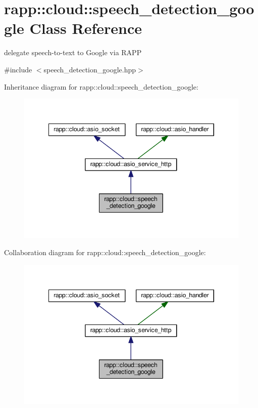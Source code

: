 \hypertarget{classrapp_1_1cloud_1_1speech__detection__google}{\section{rapp\-:\-:cloud\-:\-:speech\-\_\-detection\-\_\-google Class Reference}
\label{classrapp_1_1cloud_1_1speech__detection__google}
}


delegate speech-\/to-\/text to Google via R\-A\-P\-P  




{\ttfamily \#include $<$speech\-\_\-detection\-\_\-google.\-hpp$>$}



Inheritance diagram for rapp\-:\-:cloud\-:\-:speech\-\_\-detection\-\_\-google\-:
\nopagebreak
\begin{figure}[H]
\begin{center}
\leavevmode
\includegraphics[width=345pt]{classrapp_1_1cloud_1_1speech__detection__google__inherit__graph}
\end{center}
\end{figure}


Collaboration diagram for rapp\-:\-:cloud\-:\-:speech\-\_\-detection\-\_\-google\-:
\nopagebreak
\begin{figure}[H]
\begin{center}
\leavevmode
\includegraphics[width=345pt]{classrapp_1_1cloud_1_1speech__detection__google__coll__graph}
\end{center}
\end{figure}
